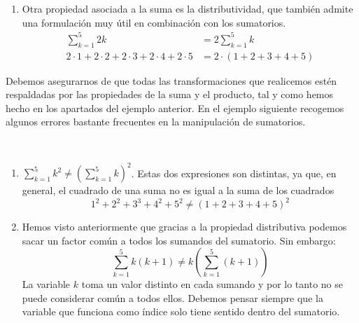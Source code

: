 \begin{ejemplo-br}
\begin{enumerate}
\item
Otra propiedad asociada a la suma es la distributividad, que también admite una formulación muy útil en combinación con los sumatorios.
\begin{align*}
\sum_{k=1}^{5}2k & = 2 \sum_{k=1}^{5}k \\
2\cdot 1+2\cdot 2+2\cdot 3+2\cdot 4+2\cdot 5 & = 2\cdot (1+2+3+4+5)\tag*{\fej}
\end{align*}
\end{enumerate}
\end{ejemplo-br}

Debemos asegurarnos de que todas las transformaciones que realicemos estén respaldadas por las propiedades de la suma y el producto, tal y como hemos hecho en los apartados del ejemplo anterior.
En el ejemplo siguiente recogemos algunos errores bastante frecuentes en la manipulación de sumatorios.
%
%
\begin{ejemplo}\ 

\vspace{-.5em}
\begin{enumerate}
\item
$\displaystyle\sum_{k=1}^{5}k^2 \ne \left(\sum_{k=1}^{5}k\right)^2$.
Estas dos expresiones son distintas, ya que, en general, el cuadrado de una suma no es igual a la suma de los cuadrados
\[
1^2+2^2+3^3+4^2+5^2 \ne (1+2+3+4+5)^2
\]
\item
Hemos visto anteriormente que gracias a la propiedad distributiva podemos sacar un factor común a todos los sumandos del sumatorio. Sin embargo:
\[
\sum_{k=1}^{5}k(k+1) \ne k\left(\sum_{k=1}^{5}(k+1)\right)
\]
La variable $k$ toma un valor distinto en cada sumando y por lo tanto no se puede considerar común a todos ellos.
Debemos pensar siempre que la variable que funciona como índice solo tiene sentido dentro del sumatorio.\fej
\end{enumerate}
\end{ejemplo}

